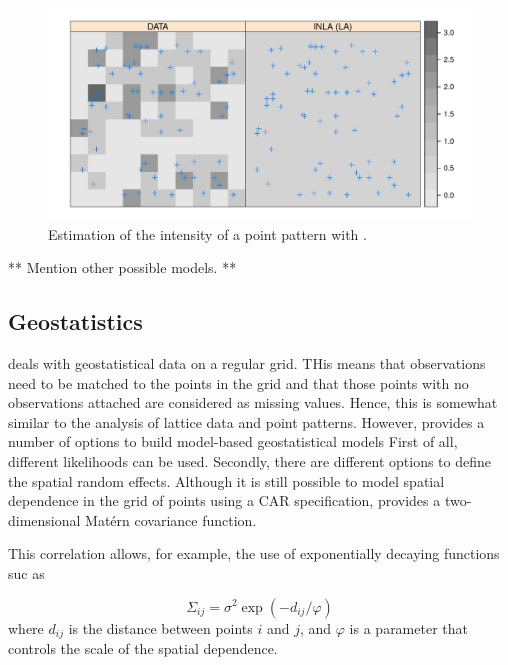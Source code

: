 \documentclass[article]{jss}
\begin{document}
\begin{figure}[h]
\begin{center}
\includegraphics{spatial_inla-008}
\end{center}
\caption{Estimation of the intensity of a point pattern with .}
\label{fig:sppa}
\end{figure}



** Mention other possible models. **

\subsection{Geostatistics}


 deals with geostatistical data on a regular grid. THis means
that observations need to be matched to the points in the grid and that those
points with no observations attached are considered as missing values.
Hence, this is somewhat similar to the analysis of lattice data and point
patterns. However,  provides a number of options to build 
model-based geostatistical models \citet{DiggleRibeiro:2007} First
of all, different likelihoods can be used. Secondly, there are different
options to define the spatial random effects. Although it is still possible
to model spatial dependence in the grid of points using a CAR specification,
 provides a two-dimensional Mat\'ern covariance function. 


This correlation allows, for example, the use of exponentially decaying
functions suc as 

$$
\Sigma_{ij} = \sigma^2 \exp(-d_{ij}/\varphi)
$$
\noindent
where $d_{ij}$ is the distance between points $i$ and $j$, and $\varphi$
is a parameter that controls the scale of the spatial dependence.


%
%
%
\end{document}
